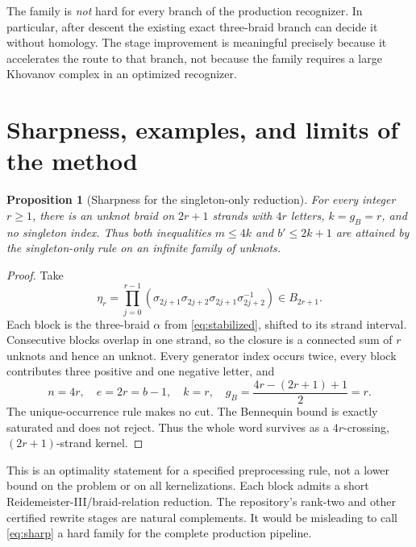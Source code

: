 \documentclass[11pt,letterpaper]{article}
\newtheorem{proposition}[theorem]{Proposition}
\theoremstyle{definition}
\begin{document}
The family is \emph{not} hard for every branch of the production recognizer. In particular, after descent the existing exact three-braid branch can decide it without homology. The stage improvement is meaningful precisely because it accelerates the route to that branch, not because the family requires a large Khovanov complex in an optimized recognizer.

\section{Sharpness, examples, and limits of the method}
\label{sec:limits}

\begin{proposition}[Sharpness for the singleton-only reduction]
\label{prop:sharp}
For every integer $r\ge1$, there is an unknot braid on $2r+1$ strands with $4r$ letters, $k=g_B=r$, and no singleton index. Thus both inequalities $m\le4k$ and $b'\le2k+1$ are attained by the singleton-only rule on an infinite family of unknots.
\end{proposition}
\begin{proof}
Take
\begin{equation}
 \eta_r=\prod_{j=0}^{r-1}
 \left(\sigma_{2j+1}\sigma_{2j+2}\sigma_{2j+1}\sigma_{2j+2}^{-1}\right)
 \in B_{2r+1}.
 \label{eq:sharp}
\end{equation}
Each block is the three-braid $\alpha$ from \eqref{eq:stabilized}, shifted to its strand interval. Consecutive blocks overlap in one strand, so the closure is a connected sum of $r$ unknots and hence an unknot. Every generator index occurs twice, every block contributes three positive and one negative letter, and
\[
 n=4r,\quad e=2r=b-1,\quad k=r,\quad
 g_B=\frac{4r-(2r+1)+1}{2}=r.
\]
The unique-occurrence rule makes no cut. The Bennequin bound is exactly saturated and does not reject. Thus the whole word survives as a $4r$-crossing, $(2r+1)$-strand kernel.
\end{proof}

This is an optimality statement for a specified preprocessing rule, not a lower bound on the problem or on all kernelizations. Each block admits a short Reidemeister-III/braid-relation reduction. The repository's rank-two and other certified rewrite stages are natural complements. It would be misleading to call \eqref{eq:sharp} a hard family for the complete production pipeline.
\end{document}
